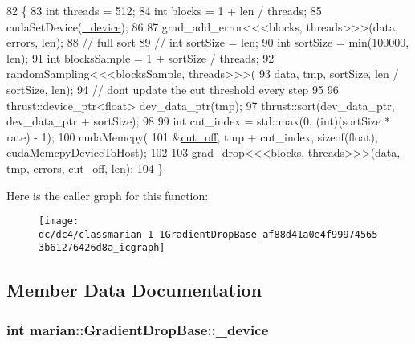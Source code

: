 \begin{DoxyCode}
82                                                                    \{
83     \textcolor{keywordtype}{int} threads = 512;
84     \textcolor{keywordtype}{int} blocks = 1 + len / threads;
85     cudaSetDevice(\hyperlink{classmarian_1_1GradientDropBase_a2ad2b7d1cb32b380dbf5e87672f0cf55}{\_device});
86 
87     grad\_add\_error<<<blocks, threads>>>(data, errors, len);
88     \textcolor{comment}{// full sort}
89     \textcolor{comment}{// int sortSize = len;}
90     \textcolor{keywordtype}{int} sortSize = min(100000, len);
91     \textcolor{keywordtype}{int} blocksSample = 1 + sortSize / threads;
92     randomSampling<<<blocksSample, threads>>>(
93         data, tmp, sortSize, len / sortSize, len);
94     \textcolor{comment}{// dont update the cut threshold every step}
95 
96     thrust::device\_ptr<float> dev\_data\_ptr(tmp);
97     thrust::sort(dev\_data\_ptr, dev\_data\_ptr + sortSize);
98 
99     \textcolor{keywordtype}{int} cut\_index = std::max(0, (\textcolor{keywordtype}{int})(sortSize * rate) - 1);
100     cudaMemcpy(
101         &\hyperlink{classmarian_1_1GradientDropBase_ae0a2f7a33c37a512aae27cc064a76055}{cut\_off}, tmp + cut\_index, \textcolor{keyword}{sizeof}(\textcolor{keywordtype}{float}), cudaMemcpyDeviceToHost);
102 
103     grad\_drop<<<blocks, threads>>>(data, tmp, errors, \hyperlink{classmarian_1_1GradientDropBase_ae0a2f7a33c37a512aae27cc064a76055}{cut\_off}, len);
104   \}
\end{DoxyCode}


Here is the caller graph for this function\+:
\nopagebreak
\begin{figure}[H]
\begin{center}
\leavevmode
\texttt{[image: dc/dc4/classmarian\_1\_1GradientDropBase\_af88d41a0e4f999745653b61276426d8a\_icgraph]}
\end{center}
\end{figure}




\subsection{Member Data Documentation}
\subsubsection[{\texorpdfstring{\+\_\+device}{_device}}]{\setlength{\rightskip}{0pt plus 5cm}int marian\+::\+Gradient\+Drop\+Base\+::\+\_\+device\hspace{0.3cm}{\ttfamily [private]}}\hypertarget{classmarian_1_1GradientDropBase_a2ad2b7d1cb32b380dbf5e87672f0cf55}{}\label{classmarian_1_1GradientDropBase_a2ad2b7d1cb32b380dbf5e87672f0cf55}


